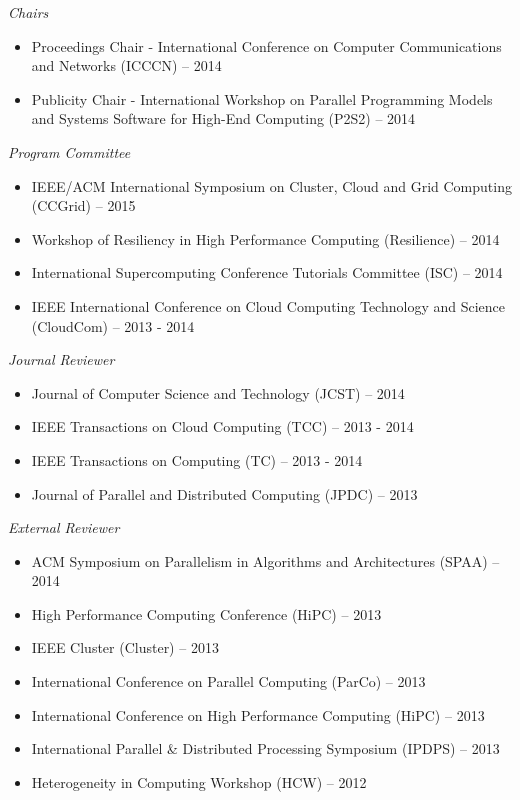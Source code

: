 {\sl Chairs}
\begin{itemize}
    \item Proceedings Chair - International Conference on Computer
        Communications and Networks (ICCCN) -- 2014
    \item Publicity Chair - International Workshop on Parallel Programming
        Models and Systems Software for High-End Computing (P2S2) -- 2014
\end{itemize}

{\sl Program Committee}
\begin{itemize}
    \item IEEE/ACM International Symposium on Cluster, Cloud and Grid
        Computing (CCGrid) -- 2015
    \item Workshop of Resiliency in High Performance Computing (Resilience) --
        2014
    \item International Supercomputing Conference Tutorials Committee (ISC) --
        2014
    \item IEEE International Conference on Cloud Computing Technology and
        Science (CloudCom) -- 2013 - 2014
\end{itemize}

{\sl Journal Reviewer}
\begin{itemize}
    \item Journal of Computer Science and Technology (JCST) -- 2014
    \item IEEE Transactions on Cloud Computing (TCC) -- 2013 - 2014
    \item IEEE Transactions on Computing (TC) -- 2013 - 2014
    \item Journal of Parallel and Distributed Computing (JPDC) -- 2013
\end{itemize}

{\sl External Reviewer}
\begin{itemize}
    \item ACM Symposium on Parallelism in Algorithms and Architectures (SPAA) -- 2014
    \item High Performance Computing Conference (HiPC) -- 2013
    \item IEEE Cluster (Cluster) -- 2013
    \item International Conference on Parallel Computing (ParCo) -- 2013
    \item International Conference on High Performance Computing (HiPC) -- 2013
    \item International Parallel \& Distributed Processing Symposium (IPDPS) -- 2013
    \item Heterogeneity in Computing Workshop (HCW) -- 2012
\end{itemize}

